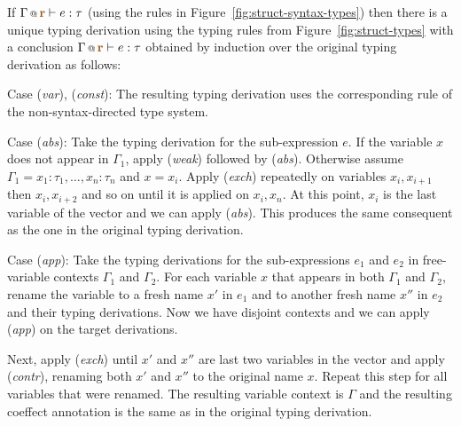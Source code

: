 \begin{proposition}
\label{thm:struct-unique-transl}
  If $\coctx{\Gamma}{\aclrd{\textbf{r}}} \vdash e : \tau$ (using the rules in
  Figure~\ref{fig:struct-syntax-types}) then there is a unique typing derivation
  using the typing rules from Figure~\ref{fig:struct-types} with a conclusion
  $\coctx{\Gamma}{\aclrd{\textbf{r}}} \vdash e : \tau$ obtained by induction over
  the original typing derivation as follows:

\vspace{0.5em}\noindent\hangindent=0.6cm
Case (\emph{var}), (\emph{const}): The resulting typing derivation uses the corresponding
  rule of the non-syntax-directed type system.

\vspace{0.5em}\noindent\hangindent=0.6cm
Case (\emph{abs}): Take the typing derivation for the sub-expression $e$. If the variable $x$
  does not appear in $\Gamma_1$, apply (\emph{weak}) followed by (\emph{abs}). Otherwise
  assume $\Gamma_1 = x_1\!:\!\tau_1,\ldots,x_n\!:\!\tau_n$ and $x=x_i$. Apply (\emph{exch})
  repeatedly on variables $x_i, x_{i+1}$ then $x_i, x_{i+2}$ and so on until it is applied
  on $x_i, x_n$. At this point, $x_i$ is the last variable of the vector and we can apply
  (\emph{abs}). This produces the same consequent as the one in the original typing derivation.

\vspace{0.5em}\noindent\hangindent=0.6cm
Case (\emph{app}): Take the typing derivations for the sub-expressions $e_1$ and $e_2$ in
  free-variable contexts $\Gamma_1$ and $\Gamma_2$. For each variable $x$ that appears in both
  $\Gamma_1$ and $\Gamma_2$, rename the variable to a fresh name $x'$ in $e_1$ and to another
  fresh name $x''$ in $e_2$ and their typing derivations. Now we have disjoint contexts and
  we can apply (\emph{app}) on the target derivations.

\vspace{0.5em}\noindent\hspace{0.6cm}\hangindent=0.6cm
  Next, apply (\emph{exch}) until $x'$ and $x''$ are last two variables in the vector and apply
  (\emph{contr}), renaming both $x'$ and $x''$ to the original name $x$. Repeat this step for
  all variables that were renamed. The resulting variable context is $\Gamma$ and the resulting
  coeffect annotation is the same as in the original typing derivation.
\end{proposition}



